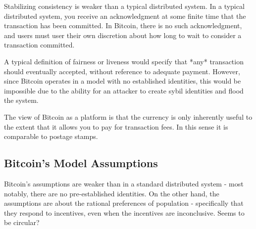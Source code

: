 Stabilizing consistency is weaker than a typical distributed system. In a typical distributed system, you receive an acknowledgment at some finite time that the transaction has been committed. In Bitcoin, there is no such acknowledgment, and users must user their own discretion about how long to wait to consider a transaction committed.

A typical definition of fairness or liveness would specify that *any* transaction should eventually accepted, without reference to adequate payment. However, since Bitcoin operates in a model with no established identities, this would be impossible due to the ability for an attacker to create sybil identities and flood the system.

The view of Bitcoin as a platform is that the currency is only inherently useful to the extent that it allows you to pay for transaction fees. In this sense it is comparable to postage stamps.

\subsection{Bitcoin's Model Assumptions}

Bitcoin's assumptions are weaker than in a standard distributed system - most notably, there are no pre-established identities. On the other hand, the assumptions are about the rational preferences of population - specifically that they respond to incentives, even when the incentives are inconclusive. Seems to be circular?


